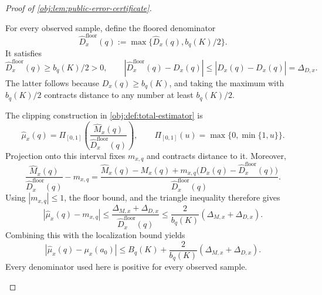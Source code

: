 \documentclass[11pt]{article}
\begin{document}
\begin{proof}[Proof of \cref{obj:lem:public-error-certificate}]
\begin{enumerate}
For every observed sample, define the floored denominator
\[
\widehat D_x^{\mathrm{floor}}(q)
:=\max\{\widehat D_x(q),b_q(K)/2\}.
\]
It satisfies
\[
\widehat D_x^{\mathrm{floor}}(q)\ge b_q(K)/2>0,
\qquad
|\widehat D_x^{\mathrm{floor}}(q)-D_x(q)|
\le|\widehat D_x(q)-D_x(q)|=\Delta_{D,x}.
\]
The latter follows because \(D_x(q)\ge b_q(K)\), and taking the maximum
with \(b_q(K)/2\) contracts distance to any number at least \(b_q(K)/2\).

The clipping construction in \cref{obj:def:total-estimator} is
\[
\widehat\mu_x(q)
=\Pi_{[0,1]}
 \left(\frac{\widehat M_x(q)}
 {\widehat D_x^{\mathrm{floor}}(q)}\right),
\qquad
\Pi_{[0,1]}(u)=\max\{0,\min\{1,u\}\}.
\]
Projection onto this interval fixes \(m_{x,q}\) and contracts distance
to it. Moreover,
\[
\frac{\widehat M_x(q)}{\widehat D_x^{\mathrm{floor}}(q)}-m_{x,q}
=
\frac{\widehat M_x(q)-M_x(q)
      +m_{x,q}\bigl(D_x(q)-\widehat D_x^{\mathrm{floor}}(q)\bigr)}
     {\widehat D_x^{\mathrm{floor}}(q)}.
\]
Using \(|m_{x,q}|\le1\), the floor bound, and the triangle inequality
therefore gives
\[
|\widehat\mu_x(q)-m_{x,q}|
\le\frac{\Delta_{M,x}+\Delta_{D,x}}
          {\widehat D_x^{\mathrm{floor}}(q)}
\le\frac2{b_q(K)}(\Delta_{M,x}+\Delta_{D,x}).
\]
Combining this with the localization bound yields
\[
|\widehat\mu_x(q)-\mu_x(a_0)|
\le B_q(K)+\frac2{b_q(K)}(\Delta_{M,x}+\Delta_{D,x}).
\]
Every denominator used here is positive for every observed sample.


\end{enumerate}
\end{proof}
\end{document}
